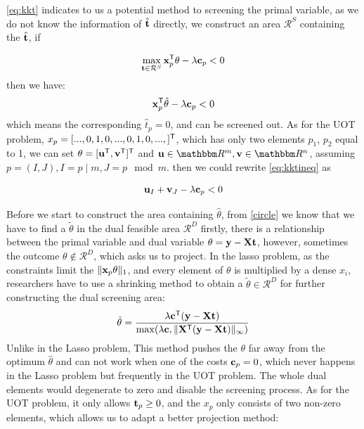 \ref{eq:kkt} indicates to us a potential method to screening the primal variable, as we do not know the information of $\hat{\mathbf t}$ directly, we construct an area $\mathcal{R}^{S}$ containing the $\hat{\mathbf t}$, if

\begin{equation}
\max_{\mathbf t \in \mathcal{R}^S} \mathbf{x}_p^{\mathsf T}\theta -\lambda \mathbf c_p < 0
\end{equation}
then we have:
 \begin{equation}
 \mathbf{x}_p^{\mathsf T}\hat{\theta} -\lambda \mathbf c_p < 0 
 \label{eq:kktineq}
\end{equation}
which means the corresponding $\hat{t}_p = 0$, and can be screened out.
As for the UOT problem, $x_p = [...,0,1,0,...,0,1,0,...,]^{\mathsf T}$, which has only two elements $p_1$, $p_2$ equal to 1, we can set $\theta = [\mathbf u^{\mathsf T},\mathbf v^{\mathsf T}]^{\mathsf T}$ and $\vu\in\R^{m}, \vv\in\R^{n}$, assuming $p=(I,J), I = p \mid m, J = p \mod m$. then we could rewrite \ref{eq:kktineq} as 

 \begin{equation}
\mathbf u_{I} + \mathbf v_{J}-\lambda \mathbf c_p < 0
\end{equation}

Before we start to construct the area containing $\hat{\theta}$, from \ref{circle} we know that we have to find a $\tilde{\theta}$ in the dual feasible area $\mathcal{R}^{D}$ firstly, there is a relationship between the primal variable and dual variable $\theta = \mathbf y - \mathbf{X}\mathbf t$, however, sometimes the outcome $\theta \notin \mathcal{R}^{D}$, which asks us to project. In the lasso problem, as the constraints limit the $\|\mathbf{x}_p \theta\|_1$, and every element of $\theta$ is multiplied by a dense $x_i$, researchers have to use a shrinking method to obtain a $\tilde{\theta} \in \mathcal{R}^{D}$ for further constructing the dual screening area: 
\begin{equation}
\tilde{\theta} = \frac{\lambda \mathbf c ^{\mathsf T}(\mathbf y - \mathbf{X} \mathbf t)}{\max(\lambda \mathbf c, \|\mathbf{X}^{\mathsf T}(\mathbf y-\mathbf{X}\mathbf t)\|_{\infty})}
\end{equation}
Unlike in the Lasso problem, This method pushes the $\theta$ far away from the optimum $\hat{\theta}$ and can not work when one of the costs $\mathbf c_p = 0$, which never happens in the Lasso problem but frequently in the UOT problem. The whole dual elements would degenerate to zero and disable the screening process. As for the UOT problem, it only allows $\mathbf t_p \geq 0$, and the $x_p$ only consists of two non-zero elements, which allows us to adapt a better projection method:


